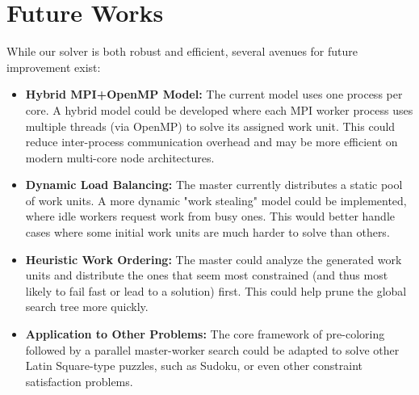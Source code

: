 \section{Future Works}
While our solver is both robust and efficient, several avenues for future improvement exist:
\begin{itemize}
    \item \textbf{Hybrid MPI+OpenMP Model:} The current model uses one process per core. A hybrid model could be developed where each MPI worker process uses multiple threads (via OpenMP) to solve its assigned work unit. This could reduce inter-process communication overhead and may be more efficient on modern multi-core node architectures.
    \item \textbf{Dynamic Load Balancing:} The master currently distributes a static pool of work units. A more dynamic "work stealing" model could be implemented, where idle workers request work from busy ones. This would better handle cases where some initial work units are much harder to solve than others.
    \item \textbf{Heuristic Work Ordering:} The master could analyze the generated work units and distribute the ones that seem most constrained (and thus most likely to fail fast or lead to a solution) first. This could help prune the global search tree more quickly.
    \item \textbf{Application to Other Problems:} The core framework of pre-coloring followed by a parallel master-worker search could be adapted to solve other Latin Square-type puzzles, such as Sudoku, or even other constraint satisfaction problems.
\end{itemize}